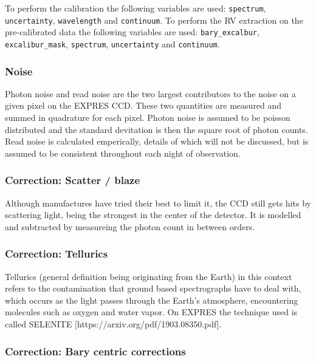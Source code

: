To perform the calibration the following variables are used: \verb|spectrum|, \verb|uncertainty|, \verb|wavelength| and \verb|continuum|. To perform the RV extraction on the pre-calibrated data the following variables are used: \verb|bary_excalbur|, 
\verb|excalibur_mask|, \verb|spectrum|, \verb|uncertainty| and \verb|continuum|.

\subsubsection{Noise}
Photon noise and read noise are the two largest contributors to the noise on a given pixel on the EXPRES CCD. These two quantities are measured and summed in quadrature for each pixel. Photon noise is assumed to be poisson distributed and the standard devitation is then the square root of photon counts. Read noise is calculated emperically, details of which will not be discussed, but is assumed to be consistent throughout each night of observation. 

\subsubsection{Correction: Scatter / blaze}
Although manufactures have tried their best to limit it, the CCD still gets hits by scattering light, being the strongest in the center of the detector. It is modelled and subtracted by measureing the photon count in between orders.

\subsubsection{Correction: Tellurics}
Tellurics (general definition being originating from the Earth) in this context refers to the contamination that ground based spectrographs have to deal with, which occurs as the light passes through the Earth's atmosphere, encountering molecules such as oxygen and water vapor. On EXPRES the technique used is called SELENITE [https://arxiv.org/pdf/1903.08350.pdf].


\subsubsection{Correction: Bary centric corrections}




